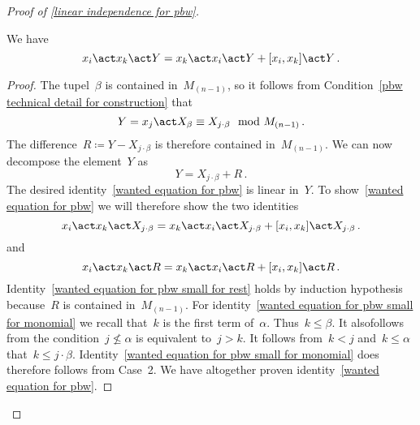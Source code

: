 \begin{proof}[Proof of \cref{linear independence for pbw}]
\begin{description}
			\begin{claim}
				We have
				\begin{equation}
					\label{wanted equation for pbw}
					x_i \act x_k \act Y
					=
					x_k \act x_i \act Y
					+ [x_i, x_k] \act Y \,.
				\end{equation}
			\end{claim}

			\begin{proof}
				The tupel~$\beta$ is contained in~$M_{(n-1)}$, so it follows from Condition~\ref{pbw technical detail for construction} that
				\[
					Y
					=
					x_j \act X_\beta
					\equiv
					X_{j \cdot \beta}
					\mod
					M_{(n-1)} \,.
				\]
				The difference~$R \coloneqq Y - X_{j \cdot \beta}$ is therefore contained in~$M_{(n-1)}$.
				We can now decompose the element~$Y$ as
				\[
					Y
					=
					X_{j \cdot \beta} + R  \,.
				\]
				The desired identity~\eqref{wanted equation for pbw} is linear in~$Y$.
				To show~\eqref{wanted equation for pbw} we will therefore show the two identities
				\begin{equation}
					\label{wanted equation for pbw small for monomial}
					x_i \act x_k \act X_{j \cdot \beta}
					=
					x_k \act x_i \act X_{j \cdot \beta}
					+ [x_i, x_k] \act X_{j \cdot \beta} \,.
				\end{equation}
				and
				\begin{equation}
					\label{wanted equation for pbw small for rest}
					x_i \act x_k \act R
					=
					x_k \act x_i \act R
					+ [x_i, x_k] \act R \,.
				\end{equation}
				Identity~\eqref{wanted equation for pbw small for rest} holds by induction hypothesis because~$R$ is contained in~$M_{(n-1)}$.
				For identity~\eqref{wanted equation for pbw small for monomial} we recall that~$k$ is the first term of~$\alpha$.
				Thus~$k \leq \beta$.
				It alsofollows from the condition~$j \nleq \alpha$ is equivalent to~$j > k$.
				It follows from~$k < j$ and~$k \leq \alpha$ that~$k \leq j \cdot \beta$.
				Identity~\ref{wanted equation for pbw small for monomial} does therefore follows from Case~2.
				We have altogether proven identity~\eqref{wanted equation for pbw}.
			\end{proof}


\end{description}
\end{proof}
